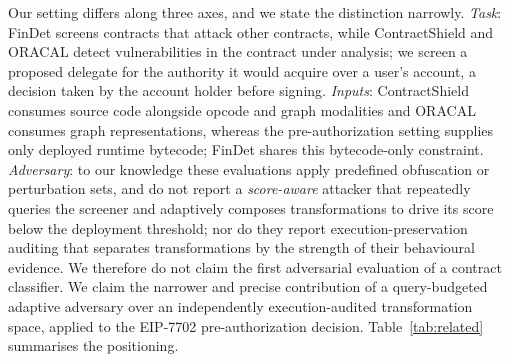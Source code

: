\documentclass[conference]{IEEEtran}
\begin{document}
Our setting differs along three axes, and we state the distinction narrowly. \emph{Task}: FinDet screens contracts that attack other contracts, while ContractShield and ORACAL detect vulnerabilities in the contract under analysis; we screen a proposed delegate for the authority it would acquire over a user's account, a decision taken by the account holder before signing. \emph{Inputs}: ContractShield consumes source code alongside opcode and graph modalities and ORACAL consumes graph representations, whereas the pre-authorization setting supplies only deployed runtime bytecode; FinDet shares this bytecode-only constraint. \emph{Adversary}: to our knowledge these evaluations apply predefined obfuscation or perturbation sets, and do not report a \emph{score-aware} attacker that repeatedly queries the screener and adaptively composes transformations to drive its score below the deployment threshold; nor do they report execution-preservation auditing that separates transformations by the strength of their behavioural evidence. We therefore do not claim the first adversarial evaluation of a contract classifier. We claim the narrower and precise contribution of a query-budgeted adaptive adversary over an independently execution-audited transformation space, applied to the EIP-7702 pre-authorization decision. Table~\ref{tab:related} summarises the positioning.
\end{document}
